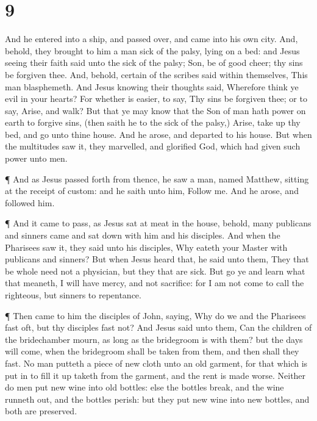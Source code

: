 \hypertarget{section-8}{%
\section{9}\label{section-8}}

 And he entered into a ship, and passed over, and came into
his own city.  And, behold, they brought to him a man sick
of the palsy, lying on a bed: and Jesus seeing their faith said unto the
sick of the palsy; Son, be of good cheer; thy sins be forgiven thee.
 And, behold, certain of the scribes said within themselves,
This man blasphemeth.  And Jesus knowing their thoughts
said, Wherefore think ye evil in your hearts?  For whether
is easier, to say, Thy sins be forgiven thee; or to say, Arise, and
walk?  But that ye may know that the Son of man hath power
on earth to forgive sins, (then saith he to the sick of the palsy,)
Arise, take up thy bed, and go unto thine house.  And he
arose, and departed to his house.  But when the multitudes
saw it, they marvelled, and glorified God, which had given such power
unto men.

 ¶ And as Jesus passed forth from thence, he saw a man,
named Matthew, sitting at the receipt of custom: and he saith unto him,
Follow me. And he arose, and followed him.

 ¶ And it came to pass, as Jesus sat at meat in the house,
behold, many publicans and sinners came and sat down with him and his
disciples.  And when the Pharisees saw it, they said unto
his disciples, Why eateth your Master with publicans and sinners?
 But when Jesus heard that, he said unto them, They that be
whole need not a physician, but they that are sick.  But go
ye and learn what that meaneth, I will have mercy, and not sacrifice:
for I am not come to call the righteous, but sinners to repentance.

 ¶ Then came to him the disciples of John, saying, Why do
we and the Pharisees fast oft, but thy disciples fast not? 
And Jesus said unto them, Can the children of the bridechamber mourn, as
long as the bridegroom is with them? but the days will come, when the
bridegroom shall be taken from them, and then shall they fast.
 No man putteth a piece of new cloth unto an old garment,
for that which is put in to fill it up taketh from the garment, and the
rent is made worse.  Neither do men put new wine into old
bottles: else the bottles break, and the wine runneth out, and the
bottles perish: but they put new wine into new bottles, and both are
preserved.

